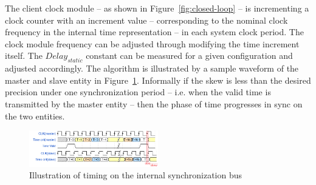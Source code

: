 \documentclass[journal]{IEEEtran}
\begin{document}
The client clock module -- as shown in Figure~\ref{fig:closed-loop} --
is incrementing a clock counter with an increment value -- corresponding to the nominal clock frequency in the internal time representation -- in each system clock period. The clock module frequency can be adjusted through modifying the time increment itself.
The $Delay_{static}$ constant can be measured for a given configuration and adjusted accordingly. The algorithm is illustrated by a sample waveform of the master and slave entity  in Figure~\ref{fig:internalbus}. Informally if the skew is less than the desired precision under one synchronization period -- i.e. when the valid time is transmitted by the master entity -- then the phase of time progresses in sync on the two entities.

\begin{figure}[!htb]
    \centering
    \includegraphics[width=0.5\textwidth]{figures_raw/internalbustiming.png}
    \caption{Illustration of timing on the internal synchronization bus}
    \label{fig:internalbus}
\end{figure}
\end{document}
